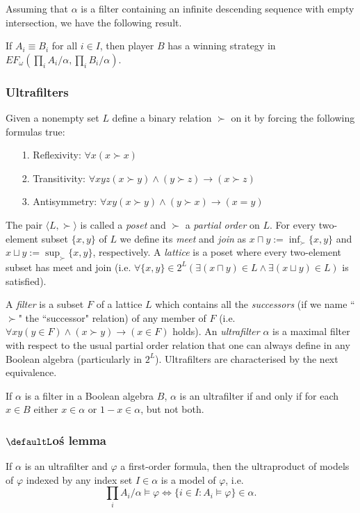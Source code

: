  
 Assuming that $\alpha$ is a filter containing an infinite descending sequence with empty intersection, we have the following result.
\begin{thm*}
If $A_i \equiv B_i$ for all $i\in I$, then player $B$ has a winning strategy in $EF_{\omega} (\prod_{i} A_i/\alpha, \prod_{i} B_i/\alpha)$.
\end{thm*}

\subsubsection*{Ultrafilters}
Given a nonempty set $L$ define a binary relation $\succ$ on it by forcing the following formulas true:
\begin{itemize} 
\item[1.] Reflexivity: $\forall x (x\succ x)$
\item[2.] Transitivity: $\forall xyz (x\succ y)\land (y\succ z)\rightarrow (x\succ z)$
\item[3.] Antisymmetry: $\forall xy (x\succ y)\land (y\succ x)\rightarrow (x=y)$ 
\end{itemize}
The pair $\langle L, \succ \rangle$ is called a \emph{poset} and $\succ$ a \emph{partial order} on $L$. For every two-element subset $\{x,y\}$ of $L$ we define its \emph{meet} and \emph{join} as $x\sqcap y := \inf_{\succ}\{x,y\}$ and $x\sqcup y := \sup_{\succ}\{x,y\}$, respectively. A \emph{lattice} is a poset where every two-element subset has meet and join (i.e. $\forall\{x,y\}\in 2^L(\exists (x\sqcap y)\in L\land\exists (x\sqcup y)\in L)$ is satisfied).

A \emph{filter} is a subset $F$ of a lattice $L$ which contains all the \emph{successors} (if we name ``$\succ$" the ``successor" relation) of any member of $F$ (i.e. $\forall xy(y\in F)\land(x\succ y)\rightarrow(x\in F)$ holds). An \emph{ultrafilter} $\alpha$ is a maximal filter with respect to the usual partial order relation that one can always define in any Boolean algebra (particularly in $2^L$). Ultrafilters are characterised by the next equivalence.

\begin{lem*}
If $\alpha$ is a filter in a Boolean algebra $B$, $\alpha$ is an ultrafilter if and only if for each $x\in B$ either $x\in\alpha$ or $1-x\in \alpha$, but not both.
\end{lem*}

\subsubsection*{$\defaultL$o\'s lemma}
\begin{lem*}
If $\alpha$ is an ultrafilter and $\varphi$ a first-order formula, then the ultraproduct of models of $\varphi$ indexed by any index set $I\in \alpha$ is a model of $\varphi$, i.e. \[\prod_i A_i / \alpha\models\varphi\Leftrightarrow\{i\in I: A_i\models\varphi\}\in \alpha.\]
\end{lem*}

